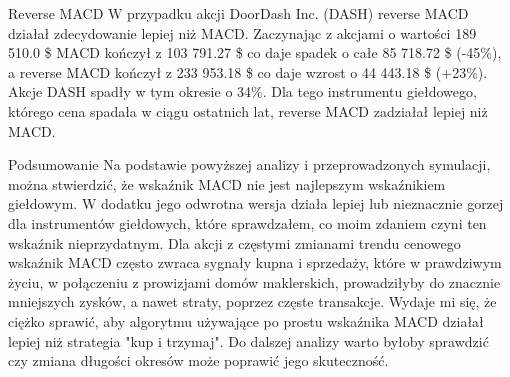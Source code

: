 \documentclass{article}
\begin{document}
\begin{section}{Reverse MACD}
    W przypadku akcji DoorDash Inc. (DASH) reverse MACD działał zdecydowanie lepiej niż MACD. Zaczynając z akcjami o wartości 189 510.0 \$
    MACD kończył z 103 791.27 \$ co daje spadek o całe 85 718.72 \$ (-45\%), a reverse MACD kończył z 233 953.18 \$ co daje wzrost o 44 443.18 \$ (+23\%). 
    Akcje DASH spadły w tym okresie o 34\%.
    Dla tego instrumentu giełdowego, którego cena spadała w ciągu ostatnich lat, reverse MACD zadziałał lepiej niż MACD.
\end{section}

\begin{section}{Podsumowanie}
    Na podstawie powyższej analizy i przeprowadzonych symulacji, można stwierdzić, że wskaźnik MACD nie jest najlepszym wskaźnikiem giełdowym.
    W dodatku jego odwrotna wersja działa lepiej lub nieznacznie gorzej dla instrumentów giełdowych, które sprawdzałem, co moim zdaniem czyni ten wskaźnik nieprzydatnym.
    Dla akcji z częstymi zmianami trendu cenowego wskaźnik MACD często zwraca sygnały kupna i sprzedaży, które w prawdziwym życiu,
    w połączeniu z prowizjami domów maklerskich, prowadziłyby do znacznie mniejszych zysków, a nawet straty, poprzez częste transakcje. 
    Wydaje mi się, że ciężko sprawić, aby algorytmu używające po prostu wskaźnika MACD działał lepiej niż strategia "kup i trzymaj".
    Do dalszej analizy warto byłoby sprawdzić czy zmiana długości okresów może poprawić jego skuteczność.
\end{section}
\end{document}
